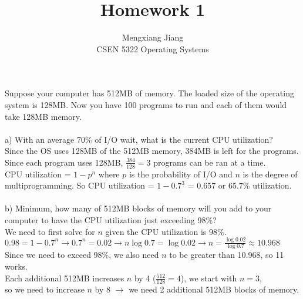 \documentclass[12pt]{article}
\newenvironment{problem}[2][Problem]{\begin{trivlist}
\item[\hskip \labelsep {\bfseries #1}\hskip \labelsep {\bfseries #2.}]}{\end{trivlist}}
\begin{document}
 
 
\title{Homework 1}%
\author{Mengxiang Jiang\\ %
CSEN 5322 Operating Systems} %
 
\maketitle
 
\begin{problem}{1} %
    Suppose your computer has 512MB of memory. The loaded size of the operating
    system is 128MB. Now you have 100 programs to run and each of them would take 128MB
    memory.\\\\
    a) With an average 70\% of I/O wait, what is the current CPU utilization?\\
    Since the OS uses 128MB of the 512MB memory, 384MB is left for the programs.\\
    Since each program uses 128MB, $\frac{384}{128} = 3$ programs can be ran at a time.\\
    CPU utilization = $1 - p^n$ where $p$ is the probability of I/O and $n$ is the degree of multiprogramming.
    So CPU utilization = $1 - 0.7^3$ = 0.657 or 65.7\% utilization.\\\\
    b) Minimum, how many of 512MB blocks of memory will you add to your computer
    to have the CPU utilization just exceeding 98\%?\\
    We need to first solve for $n$ given the CPU utilization is 98\%.\\
    $0.98 = 1 - 0.7^n \rightarrow 0.7^n = 0.02 \rightarrow n\log0.7 = \log0.02 \rightarrow n = \frac{\log0.02}{\log0.7} \approx 10.968$\\
    Since we need to exceed 98\%, we also need $n$ to be greater than 10.968, so 11 works.\\
    Each additional 512MB increases $n$ by 4 ($\frac{512}{128}=4$), we start with $n = 3$,\\
    so we need to increase $n$ by 8 $\rightarrow$ we need 2 additional 512MB blocks of memory.
\end{problem}
\end{document}
